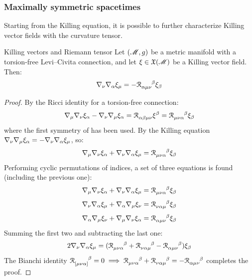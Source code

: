\subsubsection{Maximally symmetric spacetimes}

Starting from the Killing equation, it is possible to further characterize Killing vector fields with the curvature tensor.

\begin{lemma}{Killing vectors and Riemann tensor}{}
  Let $ (\mathscr{M},g) $ be a metric manifold with a torsion-free Levi--Civita connection, and let $ \xi \in \mathfrak{X}(\mathscr{M}) $ be a Killing vector field. Then:
  \begin{equation}
    \na_\nu \na_\alpha \xi_\mu = - \tensor{\rr}{_{\alpha \mu \nu}^\beta} \xi_\beta
    \label{eq:killing-riemann}
  \end{equation}
\end{lemma}

\begin{proofbox}
  \begin{proof}
    By the Ricci identity  for a torsion-free connection:
    \begin{equation*}
      \na_\mu \na_\nu \xi_\alpha - \na_\nu \na_\mu \xi_\alpha = \tensor{\rr}{_{\alpha \beta \mu \nu}} \xi^\beta = \tensor{\rr}{_{\mu \nu \alpha}^\beta} \xi_\beta
    \end{equation*}
    where the first symmetry of  has been used. By the Killing equation $ \nabla_\nu \nabla_\mu \xi_\alpha = - \nabla_\nu \nabla_\alpha \xi_\mu $, so:
    \begin{equation*}
      \na_\mu \na_\nu \xi_\alpha + \na_\nu \na_\alpha \xi_\mu = \tensor{\rr}{_{\mu \nu \alpha}^\beta} \xi_\beta
    \end{equation*}
    Performing cyclic permutations of indices, a set of three equations is found (including the previous one):
    \begin{equation*}
      \na_\mu \na_\nu \xi_\alpha + \na_\nu \na_\alpha \xi_\mu = \tensor{\rr}{_{\mu \nu \alpha}^\beta} \xi_\beta
    \end{equation*}
    \begin{equation*}
      \na_\nu \na_\alpha \xi_\mu + \na_\alpha \na_\mu \xi_\nu = \tensor{\rr}{_{\nu \alpha \mu}^\beta} \xi_\beta
    \end{equation*}
    \begin{equation*}
      \na_\alpha \na_\mu \xi_\nu + \na_\mu \na_\nu \xi_\alpha = \tensor{\rr}{_{\alpha \mu \nu}^\beta} \xi_\beta
    \end{equation*}
    Summing the first two and subtracting the last one:
    \begin{equation*}
      2 \na_\nu \na_\alpha \xi_\mu = (\tensor{\rr}{_{\mu \nu \alpha}^\beta} + \tensor{\rr}{_{\nu \alpha \mu}^\beta} - \tensor{\rr}{_{\alpha \mu \nu}^\beta}) \xi_\beta
    \end{equation*}
    The Bianchi identity $ \tensor{\rr}{_{[\mu \nu \alpha]}^\beta} = 0 \implies \tensor{\rr}{_{\mu \nu \alpha}^\beta} + \tensor{\rr}{_{\nu \alpha \mu}^\beta} = - \tensor{\rr}{_{\alpha \mu \nu}^\beta} $ completes the proof.
  \end{proof}
\end{proofbox}

